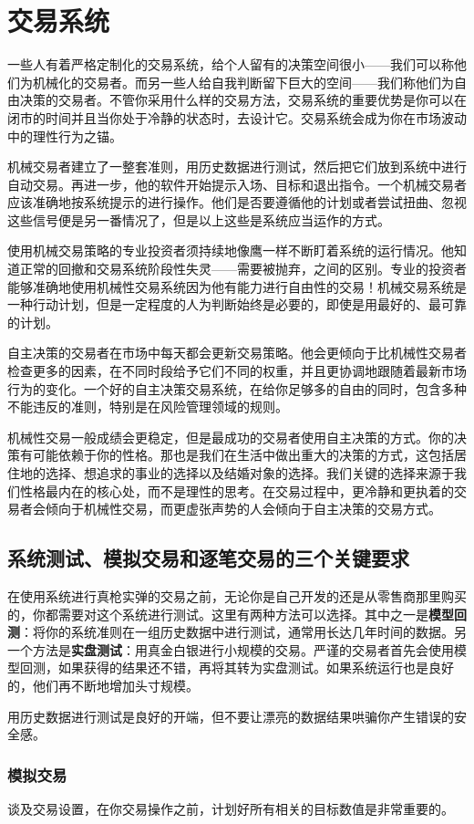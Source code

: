 \chapter{交易系统}
一些人有着严格定制化的交易系统，给个人留有的决策空间很小——我们可以称他们为机械化的交易者。而另一些人给自我判断留下巨大的空间——我们称他们为自由决策的交易者。不管你采用什么样的交易方法，交易系统的重要优势是你可以在闭市的时间并且当你处于冷静的状态时，去设计它。交易系统会成为你在市场波动中的理性行为之锚。

机械交易者建立了一整套准则，用历史数据进行测试，然后把它们放到系统中进行自动交易。再进一步，他的软件开始提示入场、目标和退出指令。一个机械交易者应该准确地按系统提示的进行操作。他们是否要遵循他的计划或者尝试扭曲、忽视这些信号便是另一番情况了，但是以上这些是系统应当运作的方式。

使用机械交易策略的专业投资者须持续地像鹰一样不断盯着系统的运行情况。他知道正常的回撤和交易系统阶段性失灵——需要被抛弃，之间的区别。专业的投资者能够准确地使用机械性交易系统因为他有能力进行自由性的交易！机械交易系统是一种行动计划，但是一定程度的人为判断始终是必要的，即使是用最好的、最可靠的计划。

自主决策的交易者在市场中每天都会更新交易策略。他会更倾向于比机械性交易者检查更多的因素，在不同时段给予它们不同的权重，并且更协调地跟随着最新市场行为的变化。一个好的自主决策交易系统，在给你足够多的自由的同时，包含多种不能违反的准则，特别是在风险管理领域的规则。

机械性交易一般成绩会更稳定，但是最成功的交易者使用自主决策的方式。你的决策有可能依赖于你的性格。那也是我们在生活中做出重大的决策的方式，这包括居住地的选择、想追求的事业的选择以及结婚对象的选择。我们关键的选择来源于我们性格最内在的核心处，而不是理性的思考。在交易过程中，更冷静和更执着的交易者会倾向于机械性交易，而更虚张声势的人会倾向于自主决策的交易方式。
\section{系统测试、模拟交易和逐笔交易的三个关键要求}
在使用系统进行真枪实弹的交易之前，无论你是自己开发的还是从零售商那里购买的，你都需要对这个系统进行测试。这里有两种方法可以选择。其中之一是\textbf{模型回测}：将你的系统准则在一组历史数据中进行测试，通常用长达几年时间的数据。另一个方法是\textbf{实盘测试}：用真金白银进行小规模的交易。严谨的交易者首先会使用模型回测，如果获得的结果还不错，再将其转为实盘测试。如果系统运行也是良好的，他们再不断地增加头寸规模。

用历史数据进行测试是良好的开端，但不要让漂亮的数据结果哄骗你产生错误的安全感。
\subsection*{模拟交易}
谈及交易设置，在你交易操作之前，计划好所有相关的目标数值是非常重要的。

